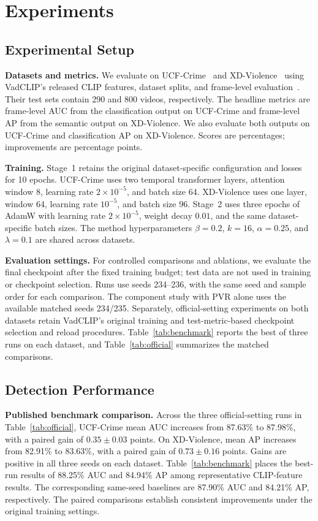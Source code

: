 \section{Experiments}
\subsection{Experimental Setup}
\textbf{Datasets and metrics.}
We evaluate on UCF-Crime~\cite{sultani2018real} and XD-Violence~\cite{wu2020xdviolence} using VadCLIP's released CLIP features, dataset splits, and frame-level evaluation~\cite{wu2024vadclip}. Their test sets contain 290 and 800 videos, respectively. The headline metrics are frame-level AUC from the classification output on UCF-Crime and frame-level AP from the semantic output on XD-Violence. We also evaluate both outputs on UCF-Crime and classification AP on XD-Violence. Scores are percentages; improvements are percentage points.

\textbf{Training.}
Stage~1 retains the original dataset-specific configuration and losses for 10 epochs. UCF-Crime uses two temporal transformer layers, attention window 8, learning rate $2\times10^{-5}$, and batch size 64. XD-Violence uses one layer, window 64, learning rate $10^{-5}$, and batch size 96. Stage~2 uses three epochs of AdamW with learning rate $2\times10^{-5}$, weight decay $0.01$, and the same dataset-specific batch sizes. The method hyperparameters $\beta=0.2$, $k=16$, $\alpha=0.25$, and $\lambda=0.1$ are shared across datasets.

\textbf{Evaluation settings.}
For controlled comparisons and ablations, we evaluate the final checkpoint after the fixed training budget; test data are not used in training or checkpoint selection. Runs use seeds 234--236, with the same seed and sample order for each comparison. The component study with PVR alone uses the available matched seeds 234/235. Separately, official-setting experiments on both datasets retain VadCLIP's original training and test-metric-based checkpoint selection and reload procedures. Table~\ref{tab:benchmark} reports the best of three runs on each dataset, and Table~\ref{tab:official} summarizes the matched comparisons.





\subsection{Detection Performance}
\textbf{Published benchmark comparison.}
Across the three official-setting runs in Table~\ref{tab:official}, UCF-Crime mean AUC increases from 87.63\% to 87.98\%, with a paired gain of $0.35\pm0.03$ points. On XD-Violence, mean AP increases from 82.91\% to 83.63\%, with a paired gain of $0.73\pm0.16$ points. Gains are positive in all three seeds on each dataset. Table~\ref{tab:benchmark} places the best-run results of 88.25\% AUC and 84.94\% AP among representative CLIP-feature results. The corresponding same-seed baselines are 87.90\% AUC and 84.21\% AP, respectively. The paired comparisons establish consistent improvements under the original training settings.

